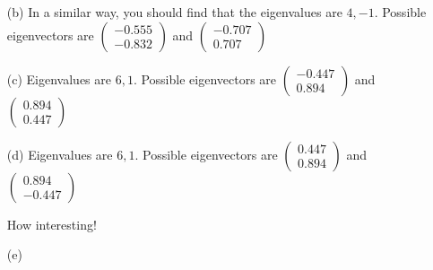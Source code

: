 \documentclass{article}
\begin{document}
\begin{enumerate}
\begin{itemize}
\item[(b)] In a similar way, you should find that the eigenvalues are $4, -1$.   Possible eigenvectors are $\left( \begin{array}{r} -0.555 \\ -0.832 \end{array} \right)$ and $\left( \begin{array}{r} -0.707 \\ 0.707 \end{array} \right)$  

\item[(c)] Eigenvalues are $6, 1$.   Possible eigenvectors are $\left( \begin{array}{r} -0.447 \\ 0.894 \end{array} \right)$ and $\left( \begin{array}{r} 0.894 \\ 0.447 \end{array} \right)$  

\item[(d)] Eigenvalues are $6, 1$.   Possible eigenvectors are $\left( \begin{array}{r} 0.447 \\ 0.894 \end{array} \right)$ and $\left( \begin{array}{r} 0.894 \\ -0.447 \end{array} \right)$  

How interesting!

\item[(e)]


\end{itemize}
\end{enumerate}
\end{document}
